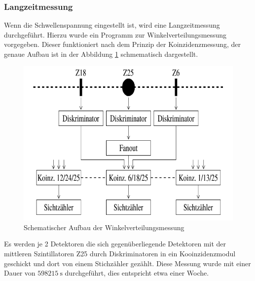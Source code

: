 \documentclass{article}
\begin{document}
\subsubsection*{Langzeitmessung}
Wenn die Schwellenspannung eingestellt ist, wird eine Langzeitmessung durchgeführt.
Hierzu wurde ein Programm zur Winkelverteilungsmessung vorgegeben. Dieser funktioniert nach dem Prinzip der Koinzidenzmessung, der genaue Aufbau ist in der Abbildung \ref{fig:AufbauWinkelverteilungLangzeit} schmematisch dargestellt.
\begin{figure}[H]
    \centering
    \includegraphics[width=1\textwidth]{figures/SchematischWinkelverteilung.png}
    \caption{Schematischer Aufbau der Winkelverteilungsmessung}
    \label{fig:AufbauWinkelverteilungLangzeit}
\end{figure}
Es werden je 2 Detektoren die sich gegenüberliegende Detektoren mit der mittleren Szintillatoren Z25 durch Diskriminatoren in ein Kooinzidenzmodul geschickt und dort von einem Stichzähler gezählt.
Diese Messung wurde mit einer Dauer von $\SI{598215}{\second}$ durchgeführt, dies entspricht etwa einer Woche.
\end{document}
